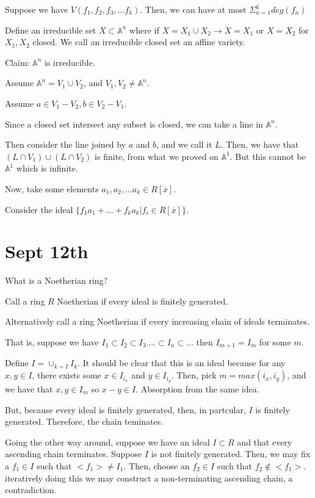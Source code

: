 \documentclass[10pt]{article}
\begin{document}
Suppose we have $V(f_1, f_2, f_3,...f_k)$. Then, we can have at most $\Sigma_{n=1}^k deg(f_n)$

Define an irreducible set $X \subset \mathbb{A}^n$ where if $X = X_1 \cup X_2 \rightarrow X = X_1 \text{ or } X = X_2$ for $X_1, X_2$ closed. We call an irreducible closed set an affine variety.

Claim: $\mathbb{A}^n$ is irreducible.

Assume $\mathbb{A}^n = V_1 \cup V_2$, and $V_1, V_2 \not= \mathbb{A}^n$.

Assume $a \in V_1 - V_2, b\in V_2 - V_1$.

Since a closed set intersect any subset is closed, we can take a line in $\mathbb{A}^n$.

Then consider the line joined by $a$ and $b$, and we call it $L$. Then, we have that $(L \cap V_1) \cup (L \cap V_2)$ is finite, from what we proved on $\mathbb{A}^1$. But this cannot be $\mathbb{A}^1$ which is infinite.

Now, take some elements $ a_1, a_2, ...a_k \in R[\overline{x}]$.

Consider the ideal $\{ f_1 a_1 + ... + f_ka_k | f_i \in R [\overline{x}] \}$. 

\section*{Sept 12th}

What is a Noetherian ring?

Call a ring $R$ Noetherian if every ideal is finitely generated.

Alternatively call a ring Noetherian if every increasing chain of ideals terminates.

That is, suppose we have $I_1 \subset I_2 \subset I_3 .... \subset I_n \subset ...$ then $I_{m+1} = I_m$ for some $m$.

Define $I = \cup_{k=I} I_k$. It should be clear that this is an ideal because for any $x,y \in I$, there exists some $x \in I_{i_x}$ and $y \in I_{i_y}$. Then, pick $m = max(i_x,i_y)$, and we have that $x,y \in I_m$ so $x-y \in I$. Absorption from the same idea.

But, because every ideal is finitely generated, then, in partcular, $I$ is finitely generated. Therefore, the chain teminates.

Going the other way around, suppose we have an ideal $I \subset R$ and that every ascending chain terminates. Suppose $I$ is not finitely generated. Then, we may fix a $f_1 \in I$ such that $<f_1> \not = I_1$. Then, choose an $f_2 \in I$ such that $f_2 \not \in <f_1>$. iteratively doing this we may construct a non-terminating ascending chain, a contradiction.
\end{document}
